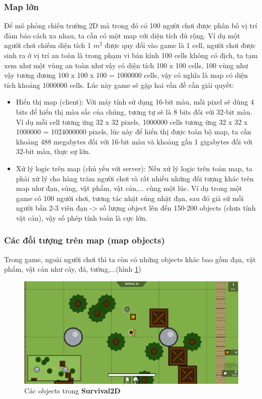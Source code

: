\documentclass[12pt,a4paper]{article}
\begin{document}
  \subsubsection{Map lớn}
  Để mô phỏng chiến trường 2D mà trong đó có 100 người chơi được phân bố vị trí đảm bảo cách xa nhau, ta cần có một map với diện tích đủ rộng. Ví dụ một người chơi chiếm diện tích 1 $m^2$ được quy đổi vào game là 1 cell, người chơi được sinh ra ở vị trí an toàn là trong phạm vi bán kính 100 cells không có địch, ta tạm xem như một vùng an toàn như vậy có diện tích 100 x 100 cells, 100 vùng như vậy tương đương 100 x 100 x 100 = 1000000 cells, vậy có nghĩa là map có diện tích khoảng 1000000 cells. Lúc này game sẽ gặp hai vấn đề cần giải quyết:
  \begin{itemize}
    \item Hiển thị map (client): Với máy tính sử dụng 16-bit màu, mỗi pixel sẽ dùng 4 bits để hiển thị màu sắc của chúng, tương tự sẽ là 8 bits đối với 32-bit màu. Ví dụ mỗi cell tương ứng 32 x 32 pixels, 1000000 cells tương ứng 32 x 32 x 1000000 = 1024000000 pixels, lúc này để hiển thị được toàn bộ map, ta cần khoảng 488 megabytes đối với 16-bit màu và khoảng gần 1 gigabytes đối với 32-bit màu, thực sự lớn.
    \item Xử lý logic trên map (chủ yếu với server): Nếu xử lý logic trên toàn map, ta phải xử lý cho hàng trăm người chơi và rất nhiều những đối tượng khác trên map như đạn, súng, vật phẩm, vật cản,... cùng một lúc. Ví dụ trong một game có 100 người chơi, tương tác nhặt súng nhặt đạn, sau đó giả sử mỗi người bắn 2-3 viên đạn -> số lượng object lên đến 150-200 objects (chưa tính vật cản), vậy số phép tính toán là cực lớn.
  \end{itemize}
  \subsubsection{Các đối tượng trên map (map objects)}
  Trong game, ngoài người chơi thì ta còn có những objects khác bao gồm đạn, vật phẩm, vật cản như cây, đá, tường,...(hình \ref{mapobjects}) 

  \begin{figure}[H]
      \centering
      \includegraphics[width=\textwidth]{Img/map/objects.png}
      \caption{Các objects trong \textbf{Survival2D}}
      \label{mapobjects}
  \end{figure}
  
\end{document}
